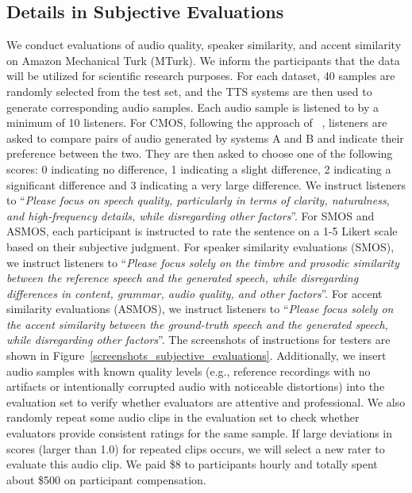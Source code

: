 \subsection{Details in Subjective Evaluations}
\label{details_subjective_evaluation}
We conduct evaluations of audio quality, speaker similarity, and accent similarity on Amazon Mechanical Turk (MTurk). We inform the participants that the data will be utilized for scientific research purposes. For each dataset, 40 samples are randomly selected from the test set, and the TTS systems are then used to generate corresponding audio samples. Each audio sample is listened to by a minimum of 10 listeners. For CMOS, following the approach of ~\citet{loizou2011speech}, listeners are asked to compare pairs of audio generated by systems A and B and indicate their preference between the two. They are then asked to choose one of the following scores: 0 indicating no difference, 1 indicating a slight difference, 2 indicating a significant difference and 3 indicating a very large difference. We instruct listeners to ``\textit{Please focus on speech quality, particularly in terms of clarity, naturalness, and high-frequency details, while disregarding other factors}''. For SMOS and ASMOS, each participant is instructed to rate the sentence on a 1-5 Likert scale based on their subjective judgment. For speaker similarity evaluations (SMOS), we instruct listeners to ``\textit{Please focus solely on the timbre and prosodic similarity between the reference speech and the generated speech, while disregarding differences in content, grammar, audio quality, and other factors}''. For accent similarity evaluations (ASMOS), we instruct listeners to ``\textit{Please focus solely on the accent similarity between the ground-truth speech and the generated speech, while disregarding other factors}''. The screenshots of instructions for testers are shown in Figure~\ref{screenshots_subjective_evaluations}. Additionally, we insert audio samples with known quality levels (e.g., reference recordings with no artifacts or intentionally corrupted audio with noticeable distortions) into the evaluation set to verify whether evaluators are attentive and professional. We also randomly repeat some audio clips in the evaluation set to check whether evaluators provide consistent ratings for the same sample. If large deviations in scores (larger than 1.0) for repeated clips occurs, we will select a new rater to evaluate this audio clip. We paid \$8 to participants hourly and totally spent about \$500 on participant compensation.

